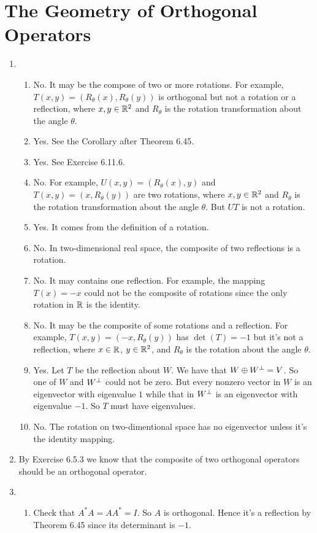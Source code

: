 \section{The Geometry of Orthogonal Operators}
\begin{enumerate}
\item \begin{enumerate}
\item No. It may be the compose of two or more rotations. For example, $T(x,y)=(R_{\theta}(x),R_{\theta}(y))$ is orthogonal but not a rotation or a reflection, where $x,y\in \mathbb{R}^2$ and $R_{\theta}$ is the rotation transformation about the angle $\theta$.
\item Yes. See the Corollary after Theorem 6.45.
\item Yes. See Exercise 6.11.6.
\item No. For example, $U(x,y)=(R_{\theta}(x),y)$ and $T(x,y)=(x,R_{\theta}(y))$ are two rotations, where $x,y\in \mathbb{R}^2$ and $R_{\theta}$ is the rotation transformation about the angle $\theta$. But $UT$ is not a rotation.
\item Yes. It comes from the definition of a rotation.
\item No. In two-dimensional real space, the composite of two reflections is a rotation.
\item No. It may contains one reflection. For example, the mapping $T(x)=-x$ could not be the composite of rotations since the only rotation in $\mathbb{R}$ is the identity.
\item No. It may be the composite of some rotations and a reflection. For example, $T(x,y)=(-x,R_{\theta}(y))$ has $\det(T)=-1$ but it's not a reflection, where $x\in \mathbb{R}$, $y\in \mathbb{R}^2$, and $R_{\theta}$ is the rotation about the angle $\theta$.
\item Yes. Let $T$ be the reflection about $W$. We have that $W\oplus W^{\perp}=V$. So one of $W$ and $W^{\perp}$ could not be zero. But every nonzero vector in $W$ is an eigenvector with eigenvalue $1$ while that in $W^{\perp}$ is an eigenvector with eigenvalue $-1$. So $T$ must have eigenvalues.
\item No. The rotation on two-dimentional space has no eigenvector unless it's the identity mapping.
\end{enumerate}
\item By Exercise 6.5.3 we know that the composite of two orthogonal operators should be an orthogonal operator.
\item \begin{enumerate}
\item Check that $A^*A=AA^*=I$. So $A$ is orthogonal. Hence it's a reflection by Theorem 6.45 since its determinant is $-1$.

\end{enumerate}
\end{enumerate}
